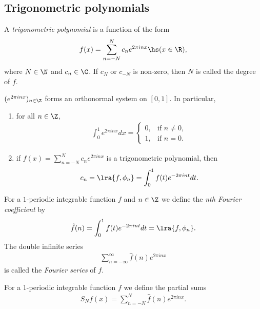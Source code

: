 \documentclass{article}
\begin{document}
\subsection{Trigonometric polynomials}

\begin{definition}
	A \emph{trigonometric polynomial} is a function of the form
	\begin{align*}
		f(x) = \sum_{n=-N}^N c_ne^{2\pi i n x} \hs (x\in\R),
	\end{align*}
	where $N\in\N$ and $c_n\in\C$. If $c_N$ or $c_{-N}$ is non-zero, then $N$ is called the
	degree of $f$.
\end{definition}

\begin{lemma}[Notes 5.1]
	$(e^{2\pi inx})_{n\in\Z}$ forms an orthonormal system on $[0,1]$. In particular,
	\begin{enumerate}
		\item for all $n\in\Z$, \begin{align*}
			      \int_0^1 e^{2\pi inx}dx = \begin{cases}
				                                0, & \text{if }n\not=0, \\
				                                1, & \text{if }n=0.
			                                \end{cases}
		      \end{align*}
		\item if $f(x)=\sum_{n=-N}^N c_ne^{2\pi inx}$ is a trigonometric polynomial, then \begin{align*}
			      c_n = \lra{f,\phi_n} = \int_0^1 f(t)e^{-2\pi int}dt.
		      \end{align*}
	\end{enumerate}
\end{lemma}

\begin{definition}
	For a $1$-periodic integrable function $f$ and $n\in\Z$ we define the \emph{nth Fourier coefficient}
	by
	\begin{align*}
		\hat f(n) = \int_0^1 f(t)e^{-2\pi int}dt=\lra{f, \phi_n}.
	\end{align*}
	The double infinite series
	\begin{align*}
		\sum_{n=-\infty}^\infty \hat f(n) e^{2\pi inx}
	\end{align*}
	is called the \emph{Fourier series} of $f$.
\end{definition}

\begin{definition}
	For a $1$-periodic integrable function $f$ we define the partial sums
	\begin{align*}
		S_Nf(x)=\sum_{n=-N}^N \hat f(n) e^{2\pi inx}.
	\end{align*}
\end{definition}
\end{document}
